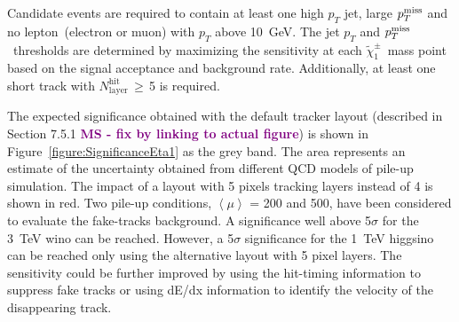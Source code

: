 \documentclass[11pt,twoside,a4paper]{cernrep}
\newcommand{\MS}[1]{\textbf{\textcolor{purple}{MS - #1}}}
\begin{document}
Candidate events are required to contain at least one high $p_{T}$ jet, large \ensuremath{p_{T}^{\rm{miss}}} and no lepton~(electron or muon) with $p_{T}$ above 10~GeV.
The jet $p_{T}$ and \ensuremath{p_{T}^{\rm{miss}}}~thresholds are determined by maximizing the sensitivity at each \ensuremath{\tilde{\chi}_{1}^{\pm}}~mass point based on the signal acceptance and background rate. Additionally, at least one short track with \ensuremath{N_{\mathrm{layer}}^{\mathrm{hit}}}\,$\geq$\,5 is required.

The expected significance obtained with the default tracker layout (described in Section 7.5.1 \MS{fix by linking to actual figure}) is shown in Figure~\ref{figure:SignificanceEta1} as the grey band.  The area represents an estimate of the uncertainty obtained from different QCD models of pile-up simulation. The impact of a layout with 5 pixels tracking layers instead of 4 is shown in red. Two pile-up conditions, $\left< \mu \right>$ {=} 200 and 500, have been considered to evaluate the fake-tracks background. A significance well above 5$\sigma$ for the 3~TeV wino can be reached. However, a 5$\sigma$ significance for the 1~TeV higgsino can be reached only using the alternative layout with 5 pixel layers. The sensitivity could be further improved by using the hit-timing information to suppress fake tracks or using dE/dx information to identify the velocity of the disappearing track.
\end{document}
